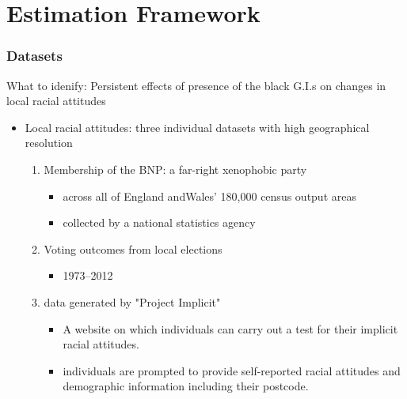 \documentclass[dvipdfmx,11pt]{beamer}
\begin{document}
\section{Estimation Framework}
\frame{\sectionpage}
\begin{frame}\frametitle{Datasets}
  What to idenify: Persistent effects of presence of the black G.I.s on changes in local racial attitudes
  \begin{itemize}
    \item Local racial attitudes: three individual datasets with high geographical resolution
    \begin{enumerate}
      \item Membership of the BNP: a far-right xenophobic party
      \begin{itemize}
        \item across all of England andWales’ 180,000 census output areas
        \item collected by a national statistics agency
      \end{itemize}
      \item Voting outcomes from local elections
      \begin{itemize}
        \item 1973–2012
      \end{itemize}
      \item data generated by "Project Implicit"
      \begin{itemize}
        \item A website on which individuals can carry out a test for their implicit racial attitudes.
        \item individuals are prompted to provide self-reported racial attitudes and demographic information including their postcode.
      \end{itemize}
    \end{enumerate}
  \end{itemize}
\end{frame}
\end{document}

